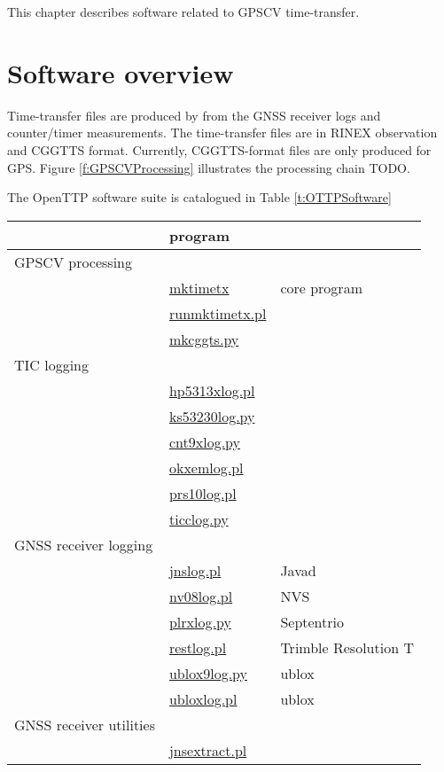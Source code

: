 
This chapter describes software related to GPSCV time-transfer.


\section{Software overview}

Time-transfer files are produced by  from the GNSS receiver logs and counter/timer measurements.
The time-transfer files are in  RINEX observation  and CGGTTS format. 
Currently, CGGTTS-format files are only produced for GPS. 
Figure \ref{f:GPSCVProcessing} illustrates the processing chain TODO. 

The OpenTTP software suite is catalogued in Table \ref{t:OTTPSoftware}
\begin{table}
\begin{tabular}{l|l|l}
	& program & \\ 
	\hline
GPSCV processing  &  & \\
	& \hyperlink{h:mktimetx}{mktimetx} & core program\\
	& \hyperlink{h:runmktimetx}{runmktimetx.pl} & \\
	& \hyperlink{h:mkcggtts}{mkcggts.py} & \\
	\hline
TIC logging & & \\
	& \hyperlink{h:hp5313xlog}{hp5313xlog.pl} &\\
	& \hyperlink{h:ks53230log}{ks53230log.py} &\\
	& \hyperlink{h:cnt9xlog}{cnt9xlog.py} &\\
	& \hyperlink{h:okxemlog}{okxemlog.pl} & \\
	& \hyperlink{h:prs10log}{prs10log.pl} & \\
	& \hyperlink{h:ticclog}{ticclog.py} & \\
	\hline
GNSS receiver logging & & \\
	&	\hyperlink{h:jnslog}{jnslog.pl} & Javad\\
	& \hyperlink{h:nvslog}{nv08log.pl} & NVS\\
	& \hyperlink{h:plrxlog}{plrxlog.py} & Septentrio\\
	& \hyperlink{h:restlog}{restlog.pl} & Trimble Resolution T\\
	& \hyperlink{h:ublox9log}{ublox9log.py} & ublox\\
	& \hyperlink{h:ubloxlog}{ubloxlog.pl} & ublox\\
GNSS receiver utilities & & \\
	& \hyperlink{h:jnsextract}{jnsextract.pl} & \\

\end{tabular}
\end{table}
